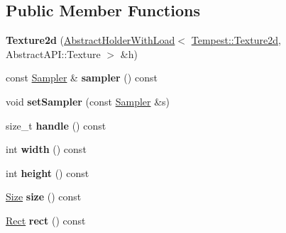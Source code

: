\subsection*{Public Member Functions}
\begin{DoxyCompactItemize}
\item 
\hypertarget{class_tempest_1_1_texture2d_a818b9171b2e40e77f56076ab8f25bfc0}{{\bfseries Texture2d} (\hyperlink{class_tempest_1_1_abstract_holder_with_load}{Abstract\+Holder\+With\+Load}$<$ \hyperlink{class_tempest_1_1_texture2d}{Tempest\+::\+Texture2d}, Abstract\+A\+P\+I\+::\+Texture $>$ \&h)}\label{class_tempest_1_1_texture2d_a818b9171b2e40e77f56076ab8f25bfc0}

\item 
\hypertarget{class_tempest_1_1_texture2d_a48ceb325b63e54d37ec41082ad42aa93}{const \hyperlink{struct_tempest_1_1_texture2d_1_1_sampler}{Sampler} \& {\bfseries sampler} () const }\label{class_tempest_1_1_texture2d_a48ceb325b63e54d37ec41082ad42aa93}

\item 
\hypertarget{class_tempest_1_1_texture2d_ae4a6541d8b556b9c0ca2421480fd55dc}{void {\bfseries set\+Sampler} (const \hyperlink{struct_tempest_1_1_texture2d_1_1_sampler}{Sampler} \&s)}\label{class_tempest_1_1_texture2d_ae4a6541d8b556b9c0ca2421480fd55dc}

\item 
\hypertarget{class_tempest_1_1_texture2d_a14de4b69e7f9f70bef2c3484ab666007}{size\+\_\+t {\bfseries handle} () const }\label{class_tempest_1_1_texture2d_a14de4b69e7f9f70bef2c3484ab666007}

\item 
\hypertarget{class_tempest_1_1_texture2d_adbf1778d1b0610a600455a232e552cef}{int {\bfseries width} () const }\label{class_tempest_1_1_texture2d_adbf1778d1b0610a600455a232e552cef}

\item 
\hypertarget{class_tempest_1_1_texture2d_a5f4a11a44f998e7aaf919dc29cd22f32}{int {\bfseries height} () const }\label{class_tempest_1_1_texture2d_a5f4a11a44f998e7aaf919dc29cd22f32}

\item 
\hypertarget{class_tempest_1_1_texture2d_aeb5c3fed48aeab99595b3260f3b51107}{\hyperlink{struct_tempest_1_1_size}{Size} {\bfseries size} () const }\label{class_tempest_1_1_texture2d_aeb5c3fed48aeab99595b3260f3b51107}

\item 
\hypertarget{class_tempest_1_1_texture2d_aedee02546b82c218e8fce517e91b93d0}{\hyperlink{struct_tempest_1_1_rect}{Rect} {\bfseries rect} () const }\label{class_tempest_1_1_texture2d_aedee02546b82c218e8fce517e91b93d0}


\end{DoxyCompactItemize}
